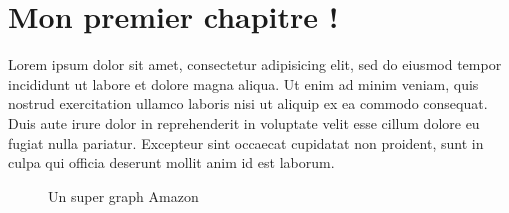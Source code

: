 \chapter{Mon premier chapitre !}
\minitoc\mtcskip

Lorem ipsum dolor sit amet, consectetur adipisicing elit, sed do eiusmod tempor
incididunt ut labore et dolore magna aliqua. Ut enim ad minim veniam, quis
nostrud exercitation ullamco laboris nisi ut aliquip ex ea commodo consequat.
Duis aute irure dolor in reprehenderit in voluptate velit esse cillum dolore eu
fugiat nulla pariatur. Excepteur sint occaecat cupidatat non proident, sunt in
culpa qui officia deserunt mollit anim id est laborum.

%
%
\begin{figure}
	\centering
	\caption{Un super graph Amazon}
\end{figure}

%
%

